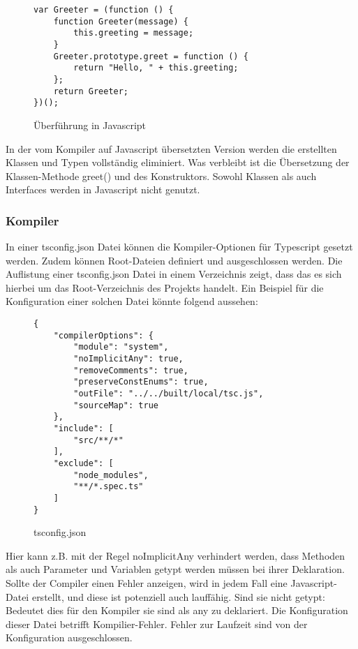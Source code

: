 \begin{figure}[t]
\begin{lstlisting}
var Greeter = (function () {
    function Greeter(message) {
        this.greeting = message;
    }
    Greeter.prototype.greet = function () {
        return "Hello, " + this.greeting;
    };
    return Greeter;
})(); 
\end{lstlisting}
\caption{Überführung in Javascript \cite{typescript-example}}
\end{figure}
In der vom Kompiler auf Javascript übersetzten Version werden die erstellten Klassen und Typen vollständig eliminiert. Was verbleibt ist die Übersetzung der Klassen-Methode greet() und des Konstruktors. Sowohl Klassen als auch Interfaces werden in Javascript nicht genutzt.

\subsubsection{Kompiler}

In einer tsconfig.json Datei können die Kompiler-Optionen für Typescript gesetzt werden. Zudem können Root-Dateien definiert und ausgeschlossen werden. Die Auflistung einer tsconfig.json Datei in einem Verzeichnis zeigt, dass das es sich hierbei um das Root-Verzeichnis des Projekts handelt. Ein Beispiel für die Konfiguration einer solchen Datei könnte folgend aussehen: 

\begin{figure}[h!]
\begin{lstlisting}
{
    "compilerOptions": {
        "module": "system",
        "noImplicitAny": true,
        "removeComments": true,
        "preserveConstEnums": true,
        "outFile": "../../built/local/tsc.js",
        "sourceMap": true
    },
    "include": [
        "src/**/*"
    ],
    "exclude": [
        "node_modules",
        "**/*.spec.ts"
    ]
}  
\end{lstlisting}
\caption{tsconfig.json \cite{tsconfig}}
\end{figure}
Hier kann z.B. mit der Regel 
\glqq noImplicitAny\grqq{} verhindert werden, dass Methoden als auch Parameter und Variablen getypt werden müssen bei ihrer Deklaration. Sollte der Compiler einen Fehler anzeigen, wird in jedem Fall eine Javascript-Datei erstellt, und diese ist potenziell auch lauffähig. Sind sie nicht getypt: Bedeutet dies für den Kompiler sie sind als any zu deklariert.
Die Konfiguration dieser Datei betrifft Kompilier-Fehler. Fehler zur Laufzeit sind von der Konfiguration ausgeschlossen.\\\\

